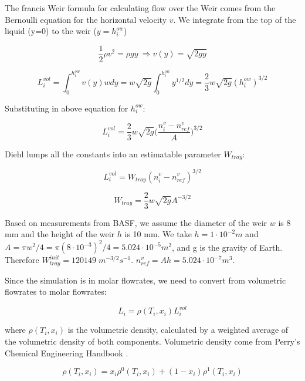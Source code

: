 The francis Weir formula for calculating flow over the Weir comes from the Bernoulli equation for the horizontal velocity $v$. We integrate from the top of the liquid (y=0) to the weir ($y=h_i^{ow}$)

\begin{equation}
    \frac{1}{2} \rho v^2 = \rho g y \ \Longrightarrow v(y) = \sqrt{2gy}
\end{equation}

\begin{equation}
    L_i^{vol} = \int_0^{h_i^{ow}} v(y)wdy = w\sqrt{2g}\int_0^{h_i^{ow}} y^{1/2}dy = \frac{2}{3}w\sqrt{2g}(h_i^{ow})^{3/2} 
\end{equation}


Substituting in above equation for  $h_i^{ow}$:

\begin{equation}
   L_i^{vol} = \frac{2}{3} w\sqrt{2g}\biggl(\frac{n^v_i-n^v_{ref}}{A}\biggr)^{3/2}  
\end{equation}

Diehl lumps all the constants into an estimatable parameter $W_{tray}$:

\begin{equation}
    L_i^{vol} = W_{tray}(n_i^v-n^v_{ref})^{3/2}
\end{equation}

\begin{equation}
    W_{tray} = \frac{2}{3}w\sqrt{2g}A^{-3/2}
\end{equation}

Based on measurements from BASF, we assume the diameter of the weir $w$ is 8 mm and the height of the weir $h$ is 10 mm. We take $h = 1\cdot10^{-2} m$ and $A=\pi w^2/4 = \pi(8 \cdot 10^{-3})^2/4 = 5.024 \cdot 10^{-5} m^2$, and g is the gravity of Earth. Therefore $W_{tray}^{init}=120149 \; m^{-3/2}s^{-1}$. $n^v_{ref}=Ah=5.024 \cdot 10^{-7} m^3$. 

Since the simulation is in molar flowrates, we need to convert from volumetric flowrates to molar flowrates:

\begin{equation}
    L_i = \rho(T_i, x_i)L^{vol}_i  
\end{equation}


where $\rho(T_i,x_i)$ is the volumetric density, calculated by a weighted average of the volumetric density of both components. Volumetric density come from Perry’s Chemical Engineering Handbook \cite{Perrys2018}.

\begin{equation}
    \rho(T_i, x_i) = x_i\rho^0(T_i, x_i) + (1-x_i)\rho^1(T_i, x_i)
\end{equation}

